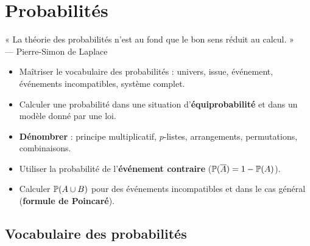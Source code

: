 \chapter{Probabilités}

\begin{citationchapitre}
	« La théorie des probabilités n'est au fond que le bon sens réduit
	au calcul. »\\[0.4em]
	— Pierre-Simon de Laplace
\end{citationchapitre}

\begin{objectifs}
	\begin{itemize}[label=\textbullet]
		\item Maîtriser le vocabulaire des probabilités : univers, issue,
		événement, événements incompatibles, système complet.
		\item Calculer une probabilité dans une situation d'\textbf{équiprobabilité}
		et dans un modèle donné par une loi.
		\item \textbf{Dénombrer} : principe multiplicatif, $p$-listes,
		arrangements, permutations, combinaisons.
		\item Utiliser la probabilité de l'\textbf{événement contraire}
		($\mathbb{P}(\overline{A})=1-\mathbb{P}(A)$).
		\item Calculer $\mathbb{P}(A\cup B)$ pour des événements incompatibles et
		dans le cas général (\textbf{formule de Poincaré}).
	\end{itemize}
\end{objectifs}


\section{Vocabulaire des probabilités}

